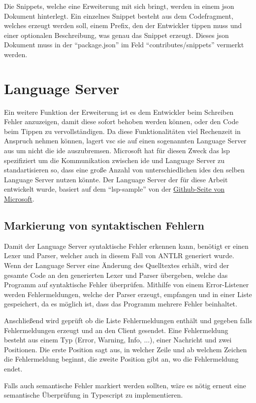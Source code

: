 Die Snippets, welche eine Erweiterung mit sich bringt, werden in einem \ac{json} Dokument hinterlegt. Ein einzelnes Snippet besteht aus dem Codefragment, welches erzeugt werden soll, einem Prefix, den der Entwickler tippen muss und einer optionalen Beschreibung, was genau das Snippet erzeugt. Dieses \ac{json} Dokument muss in der \enquote{package.json} im Feld \enquote{contributes/snippets} vermerkt werden.

\section{Language Server}
Ein weitere Funktion der Erweiterung ist es dem Entwickler beim Schreiben Fehler anzuzeigen, damit diese sofort behoben werden können, oder den Code beim Tippen zu vervollständigen. Da diese Funktionalitäten viel Rechenzeit in Anspruch nehmen können, lagert \ac{vsc} sie auf einen sogenannten Language Server aus um nicht die \ac{ide} auszubremsen. Microsoft hat für diesen Zweck das \ac{lsp} spezifiziert um die Kommunikation zwischen \ac{ide} und Language Server zu standartisieren so, dass eine große Anzahl von unterschiedlichen \ac{ide}s den selben Language Server nutzen könnte. \cite{MicrosoftCorporation2022a} Der Language Server der für diese Arbeit entwickelt wurde, basiert auf dem \enquote{lsp-sample} von der \href{https://github.com/microsoft/vscode-extension-samples}{Github-Seite von Microsoft}.

\subsection{Markierung von syntaktischen Fehlern}
Damit der Language Server syntaktische Fehler erkennen kann, benötigt er einen Lexer und Parser, welcher auch in diesem Fall von ANTLR generiert wurde. Wenn der Language Server eine Änderung des Quelltextes erhält, wird der gesamte Code an den generierten Lexer und Parser übergeben, welche das Programm auf syntaktische Fehler überprüfen. Mithilfe von einem Error-Listener werden Fehlermeldungen, welche der Parser erzeugt, empfangen und in einer Liste gespeichert, da es möglich ist, dass das Programm mehrere Fehler beinhaltet.

Anschließend wird geprüft ob die Liste Fehlermeldungen enthält und gegeben falls Fehlermeldungen erzeugt und an den Client gesendet. Eine Fehlermeldung besteht aus einem Typ (Error, Warning, Info, ...), einer Nachricht und zwei Positionen. Die erste Position sagt aus, in welcher Zeile und ab welchem Zeichen die Fehlermeldung beginnt, die zweite Position gibt an, wo die Fehlermeldung endet.

Falls auch semantische Fehler markiert werden sollten, wäre es nötig erneut eine semantische Überprüfung in Typescript zu implementieren.


